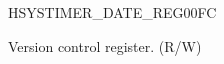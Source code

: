 \begin{register}{H}{SYSTIMER\_DATE\_REG}{\hexprefix{}00FC}\label{regdesc:SYSTIMERDATEREG}
%
\regnewline%
\begin{regdesc}\begin{reglist}
\label{fielddesc:SYSTIMERDATE}\item [SYSTIMER\_DATE] Version control register. (R/W)
\end{reglist}\end{regdesc}
\end{register}
